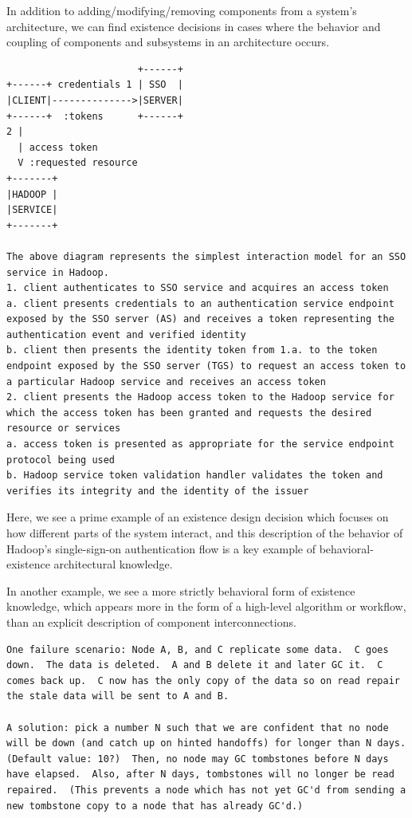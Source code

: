 \documentclass[a4paper, 12pt]{article}
\begin{document}
			In addition to adding/modifying/removing components from a system's architecture, we can find existence decisions in cases where the behavior and coupling of components and subsystems in an architecture occurs.
			\begin{verbatim}
                       +------+
+------+ credentials 1 | SSO  |
|CLIENT|-------------->|SERVER|
+------+  :tokens      +------+
2 |                    
  | access token
  V :requested resource
+-------+
|HADOOP |
|SERVICE|
+-------+

The above diagram represents the simplest interaction model for an SSO service in Hadoop.
1. client authenticates to SSO service and acquires an access token
a. client presents credentials to an authentication service endpoint exposed by the SSO server (AS) and receives a token representing the authentication event and verified identity
b. client then presents the identity token from 1.a. to the token endpoint exposed by the SSO server (TGS) to request an access token to a particular Hadoop service and receives an access token
2. client presents the Hadoop access token to the Hadoop service for which the access token has been granted and requests the desired resource or services
a. access token is presented as appropriate for the service endpoint protocol being used
b. Hadoop service token validation handler validates the token and verifies its integrity and the identity of the issuer
			\end{verbatim}
			Here, we see a prime example of an existence design decision which focuses on how different parts of the system interact, and this description of the behavior of Hadoop's single-sign-on authentication flow is a key example of behavioral-existence architectural knowledge.
			
			In another example, we see a more strictly behavioral form of existence knowledge, which appears more in the form of a high-level algorithm or workflow, than an explicit description of component interconnections.
			\begin{verbatim}
One failure scenario: Node A, B, and C replicate some data.  C goes
down.  The data is deleted.  A and B delete it and later GC it.  C
comes back up.  C now has the only copy of the data so on read repair
the stale data will be sent to A and B.

A solution: pick a number N such that we are confident that no node
will be down (and catch up on hinted handoffs) for longer than N days.
(Default value: 10?)  Then, no node may GC tombstones before N days
have elapsed.  Also, after N days, tombstones will no longer be read
repaired.  (This prevents a node which has not yet GC'd from sending a
new tombstone copy to a node that has already GC'd.)
			\end{verbatim}
			
\end{document}
